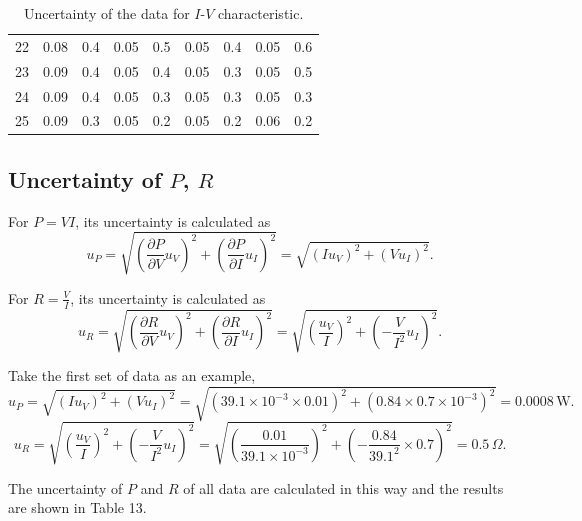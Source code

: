 \documentclass{article}
\begin{document}
{\begin{table}[H]
\begin{tabular}{ccc||cc||cc||cc}
        22 & 0.08                         & 0.4                            & 0.05                           & 0.5                          & 0.05      & 0.4        & 0.05      & 0.6        \\
        23 & 0.09                         & 0.4                            & 0.05                           & 0.4                          & 0.05      & 0.3        & 0.05      & 0.5        \\
        24 & 0.09                         & 0.4                            & 0.05                           & 0.3                          & 0.05      & 0.3        & 0.05      & 0.3        \\
        25 & 0.09                         & 0.3                            & 0.05                           & 0.2                          & 0.05      & 0.2        & 0.06      & 0.2        \\
        \bottomrule
    \end{tabular}
    \caption{Uncertainty of the data for $I$-$V$ characteristic.}\label{TableUncIV}
\end{table}

\subsection{Uncertainty of $P$, $R$}

For $P = VI$, its uncertainty is calculated as
$$u_P = \sqrt{(\frac{\partial P}{\partial V}u_V)^2 + (\frac{\partial P}{\partial I}u_I)^2} = \sqrt{(Iu_V)^2 + (Vu_I)^2}.$$

For $R = \frac{V}{I}$, its uncertainty is calculated as
$$u_R = \sqrt{(\frac{\partial R}{\partial V}u_V)^2 + (\frac{\partial R}{\partial I}u_I)^2} = \sqrt{(\frac{u_V}{I})^2 + (-\frac{V}{I^2}u_I)^2}.$$

Take the first set of data as an example,
$$u_P = \sqrt{(Iu_V)^2 + (Vu_I)^2} = \sqrt{(39.1\times 10^{-3}\times 0.01)^2 + (0.84\times 0.7\times 10^{-3})^2} = 0.0008\,\text{W}.$$
$$u_R = \sqrt{(\frac{u_V}{I})^2 + (-\frac{V}{I^2}u_I)^2} = \sqrt{(\frac{0.01}{39.1\times 10^{-3}})^2 + (-\frac{0.84}{39.1^2}\times 0.7)^2} = 0.5\,\Omega .$$

The uncertainty of $P$ and $R$ of all data are calculated in this way and the results are shown in Table 13.

}
\end{document}
